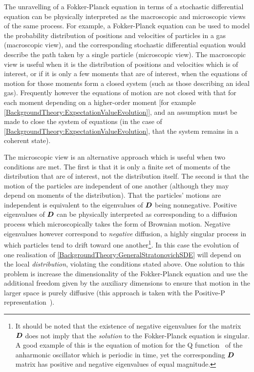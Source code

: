 The unravelling of a Fokker-Planck equation in terms of a stochastic differential equation can be physically interpreted as the macroscopic and microscopic views of the same process. For example, a Fokker-Planck equation can be used to model the probability distribution of positions and velocities of particles in a gas (macroscopic view), and the corresponding stochastic differential equation would describe the path taken by a single particle (microscopic view).  The macroscopic view is useful when it is the distribution of positions and velocities which is of interest, or if it is only a few moments that are of interest, when the equations of motion for those moments form a closed system (such as those describing an ideal gas). Frequently however the equations of motion are not closed with that for each moment depending on a higher-order moment [for example \eqref{BackgroundTheory:ExpectationValueEvolution}], and an assumption must be made to close the system of equations (in the case of \eqref{BackgroundTheory:ExpectationValueEvolution}, that the system remains in a coherent state). 

The microscopic view is an alternative approach which is useful when two conditions are met. The first is that it is only a finite set of moments of the distribution that are of interest, not the distribution itself. The second is that the motion of the particles are independent of one another (although they may depend on moments of the distribution). That the particles' motions are independent is equivalent to the eigenvalues of $\bm{D}$ being nonnegative. Positive eigenvalues of $\bm{D}$ can be physically interpreted as corresponding to a diffusion process which microscopically takes the form of Brownian motion. Negative eigenvalues however correspond to \emph{negative} diffusion, a highly singular process in which particles tend to drift toward one another\footnote{It should be noted that the existence of negative eigenvalues for the matrix $\bm{D}$ does not imply that the \emph{solution} to the Fokker-Planck equation is singular. A good example of this is the equation of motion for the Q function~\citep{Scully} of the anharmonic oscillator which is periodic in time, yet the corresponding $\bm{D}$ matrix has positive and negative eigenvalues of equal magnitude.}. In this case the evolution of one realisation of \eqref{BackgroundTheory:GeneralStratonovichSDE} will depend on the local \emph{distribution}, violating the conditions stated above. One solution to this problem is increase the dimensionality of the Fokker-Planck equation and use the additional freedom given by the auxiliary dimensions to ensure that motion in the larger space is purely diffusive (this approach is taken with the Positive-P representation~\citep{GardinerQN}). 


